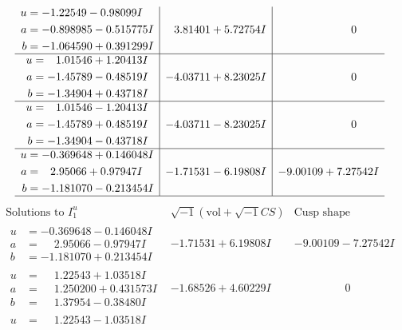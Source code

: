 \documentclass[1p]{elsarticle_modified}
\theoremstyle{definition}
\newcommand{\I}{\sqrt{-1}}
\begin{document}
$$\begin{array}{c|c|c}
\begin{aligned}
u &= -1.22549 - 0.98099 I \\
a &= -0.898985 - 0.515775 I \\
b &= -1.064590 + 0.391299 I\end{aligned}
 & \phantom{-}3.81401 + 5.72754 I & \phantom{-0.000000 } 0 \\ \hline\begin{aligned}
u &= \phantom{-}1.01546 + 1.20413 I \\
a &= -1.45789 - 0.48519 I \\
b &= -1.34904 + 0.43718 I\end{aligned}
 & -4.03711 + 8.23025 I & \phantom{-0.000000 } 0 \\ \hline\begin{aligned}
u &= \phantom{-}1.01546 - 1.20413 I \\
a &= -1.45789 + 0.48519 I \\
b &= -1.34904 - 0.43718 I\end{aligned}
 & -4.03711 - 8.23025 I & \phantom{-0.000000 } 0 \\ \hline\begin{aligned}
u &= -0.369648 + 0.146048 I \\
a &= \phantom{-}2.95066 + 0.97947 I \\
b &= -1.181070 - 0.213454 I\end{aligned}
 & -1.71531 - 6.19808 I & -9.00109 + 7.27542 I\\
 \hline 
 \end{array}$$\newpage$$\begin{array}{c|c|c}  
\text{Solutions to }I^u_{1}& \I (\text{vol} + \sqrt{-1}CS) & \text{Cusp shape}\\
 \hline 
\begin{aligned}
u &= -0.369648 - 0.146048 I \\
a &= \phantom{-}2.95066 - 0.97947 I \\
b &= -1.181070 + 0.213454 I\end{aligned}
 & -1.71531 + 6.19808 I & -9.00109 - 7.27542 I \\ \hline\begin{aligned}
u &= \phantom{-}1.22543 + 1.03518 I \\
a &= \phantom{-}1.250200 + 0.431573 I \\
b &= \phantom{-}1.37954 - 0.38480 I\end{aligned}
 & -1.68526 + 4.60229 I & \phantom{-0.000000 } 0 \\ \hline\begin{aligned}
u &= \phantom{-}1.22543 - 1.03518 I \\

\end{aligned}
\end{array}$$
\end{document}
